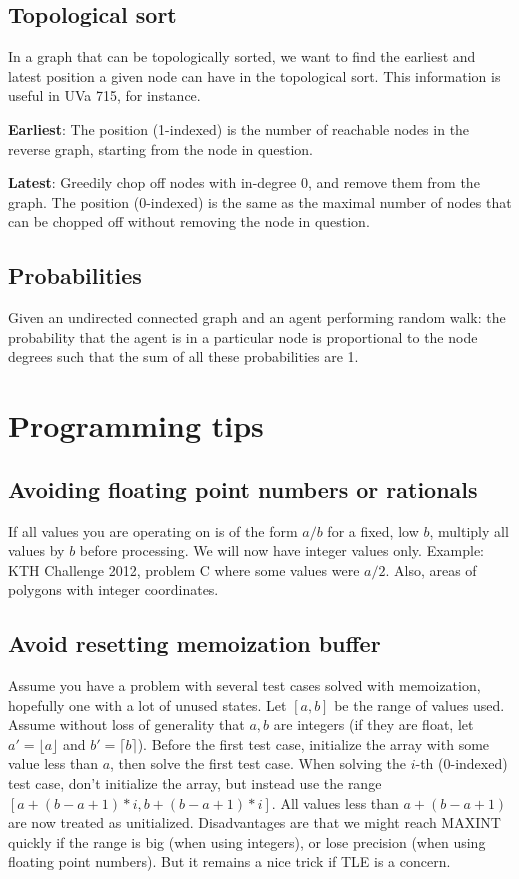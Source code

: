 \documentclass[a4paper,11pt]{article}
\begin{document}
\subsection{Topological sort}

In a graph that can be topologically sorted, we want to find the earliest and latest position a given node can have in the topological sort. This information is useful in UVa 715, for instance.

{\bf Earliest}: The position (1-indexed) is the number of reachable nodes in the reverse graph, starting from the node in question.

{\bf Latest}: Greedily chop off nodes with in-degree 0, and remove them from the graph. The position (0-indexed) is the same as the maximal number of nodes that can be chopped off without removing the node in question.

\subsection{Probabilities}

Given an undirected connected graph and an agent performing random walk: the probability that the agent is in a particular node is proportional to the node degrees such that the sum of all these probabilities are 1.

\section{Programming tips}

\subsection{Avoiding floating point numbers or rationals}

If all values you are operating on is of the form $a/b$ for a fixed, low $b$, multiply all values by $b$ before processing. We will now have integer values only. Example: KTH Challenge 2012, problem C where some values were $a/2$. Also, areas of polygons with integer coordinates.

\subsection{Avoid resetting memoization buffer}

Assume you have a problem with several test cases solved with memoization, hopefully one with a lot of unused states. Let $[a,b]$ be the range of values used. Assume without loss of generality that $a,b$ are integers (if they are float, let $a'=\lfloor a \rfloor$ and $b'=\lceil b \rceil$). Before the first test case, initialize the array with some value less than $a$, then solve the first test case. When solving the $i$-th (0-indexed) test case, don't initialize the array, but instead use the range $[a+(b-a+1)*i,b+(b-a+1)*i]$. All values less than $a+(b-a+1)$ are now treated as unitialized. Disadvantages are that we might reach MAXINT quickly if the range is big (when using integers), or lose precision (when using floating point numbers). But it remains a nice trick if TLE is a concern.
\end{document}
